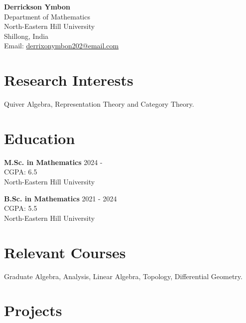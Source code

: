 \documentclass[11pt]{article}
\begin{document}
\begin{center}
{\LARGE \textbf{Derrickson Ymbon}}\\[4pt]
Department of Mathematics\\
North-Eastern Hill University\\
Shillong, India\\[4pt]
Email: \href{mailto:youremail@email.com}{derrixonymbon202@email.com}
\end{center}

\vspace{0.4cm}

\section*{Research Interests}

Quiver Algebra, Representation Theory and Category Theory.

\section*{Education}


\noindent \textbf{M.Sc. in Mathematics} \hfill 2024 - \\
CGPA: 6.5\\
North-Eastern Hill University

\vspace{0.2cm}

\noindent \textbf{B.Sc. in Mathematics} \hfill 2021 - 2024\\
CGPA: 5.5\\
North-Eastern Hill University 



\section*{Relevant Courses}
Graduate Algebra, Analysis, Linear Algebra, Topology, Differential Geometry. 


\section*{Projects}
\end{document}
